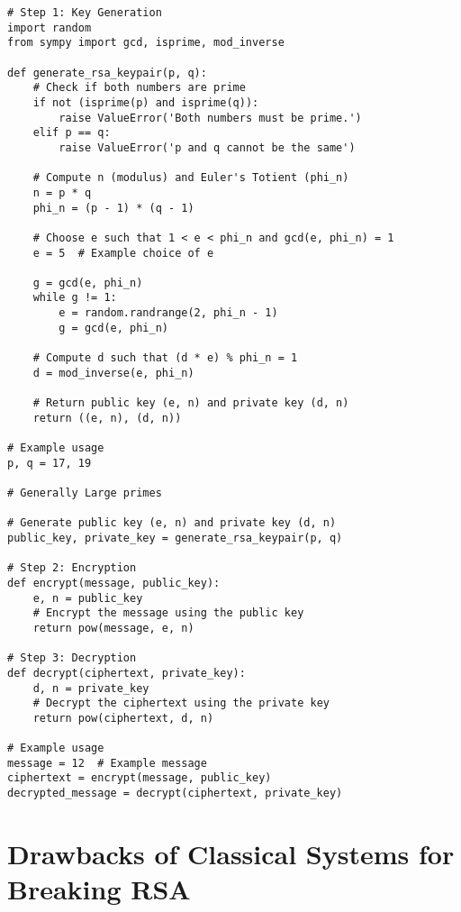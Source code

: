 \documentclass{article}
\begin{document}
\sloppy
\begin{lstlisting}
# Step 1: Key Generation
import random
from sympy import gcd, isprime, mod_inverse

def generate_rsa_keypair(p, q):
    # Check if both numbers are prime
    if not (isprime(p) and isprime(q)):
        raise ValueError('Both numbers must be prime.')
    elif p == q:
        raise ValueError('p and q cannot be the same')
    
    # Compute n (modulus) and Euler's Totient (phi_n)
    n = p * q
    phi_n = (p - 1) * (q - 1)

    # Choose e such that 1 < e < phi_n and gcd(e, phi_n) = 1
    e = 5  # Example choice of e

    g = gcd(e, phi_n)
    while g != 1:
        e = random.randrange(2, phi_n - 1)
        g = gcd(e, phi_n)

    # Compute d such that (d * e) % phi_n = 1
    d = mod_inverse(e, phi_n)
    
    # Return public key (e, n) and private key (d, n)
    return ((e, n), (d, n))
    
# Example usage
p, q = 17, 19

# Generally Large primes

# Generate public key (e, n) and private key (d, n)
public_key, private_key = generate_rsa_keypair(p, q)

# Step 2: Encryption
def encrypt(message, public_key):
    e, n = public_key
    # Encrypt the message using the public key
    return pow(message, e, n)

# Step 3: Decryption
def decrypt(ciphertext, private_key):
    d, n = private_key
    # Decrypt the ciphertext using the private key
    return pow(ciphertext, d, n)

# Example usage
message = 12  # Example message
ciphertext = encrypt(message, public_key)
decrypted_message = decrypt(ciphertext, private_key)
\end{lstlisting}

\section{Drawbacks of Classical Systems for Breaking RSA}
\end{document}
